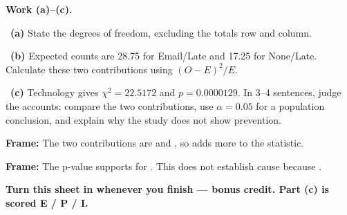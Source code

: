 \documentclass[11pt]{article}
\begin{document}
\newpage
\textbf{Work (a)--(c).}\par\smallskip

~\textbf{(a)} State the degrees of freedom, excluding the totals row and column.\par
\workspace{0.7in}

~\textbf{(b)} Expected counts are 28.75 for Email/Late and 17.25 for None/Late. Calculate these two contributions using $(O-E)^2/E$.\par
\workspace{1.4in}

~\textbf{(c)} Technology gives $\chi^2=22.5172$ and $p=0.0000129$. In 3--4 sentences, judge the accounts: compare the two contributions, use $\alpha=0.05$ for a population conclusion, and explain why the study does not show prevention.\par
\workspace{2.0in}

\begin{sentenceframebox}\raggedright\textbf{Frame:} The two contributions are \blank[0.8in] and \blank[0.8in], so \blank[1.8in] adds more to the statistic.\end{sentenceframebox}

\begin{sentenceframebox}\raggedright\textbf{Frame:} The p-value supports \blank[1.7in] for \blank[1.7in]. This does not establish cause because \blank[2.0in].\end{sentenceframebox}

\textbf{Turn this sheet in whenever you finish --- bonus credit. Part (c) is scored E / P / I.}\par
\end{document}
